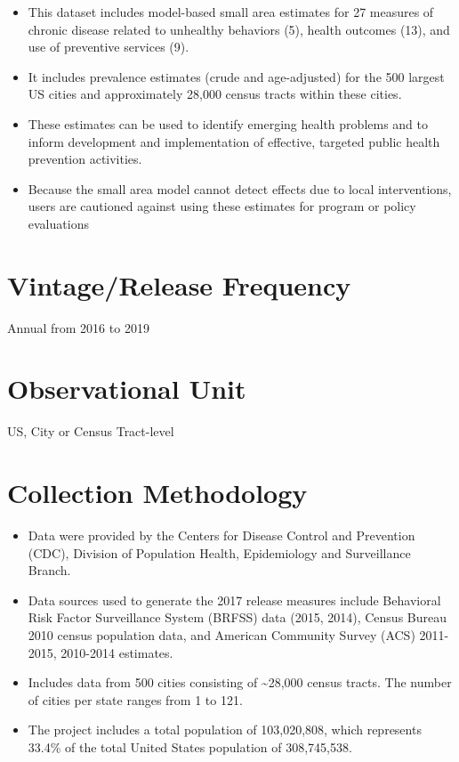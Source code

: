 \documentclass[
]{book}
\providecommand{\tightlist}{%
  \setlength{\itemsep}{0pt}\setlength{\parskip}{0pt}}
\begin{document}
\begin{itemize}
\tightlist
\item
  This dataset includes model-based small area estimates for 27 measures of chronic disease related to unhealthy behaviors (5), health outcomes (13), and use of preventive services (9).
\item
  It includes prevalence estimates (crude and age-adjusted) for the 500 largest US cities and approximately 28,000 census tracts within these cities.
\item
  These estimates can be used to identify emerging health problems and to inform development and implementation of effective, targeted public health prevention activities.
\item
  Because the small area model cannot detect effects due to local interventions, users are cautioned against using these estimates for program or policy evaluations
\end{itemize}

\hypertarget{vintagerelease-frequency-98}{%
\section{Vintage/Release Frequency}\label{vintagerelease-frequency-98}}

Annual from 2016 to 2019

\hypertarget{observational-unit-98}{%
\section{Observational Unit}\label{observational-unit-98}}

US, City or Census Tract-level

\hypertarget{collection-methodology-98}{%
\section{Collection Methodology}\label{collection-methodology-98}}

\begin{itemize}
\tightlist
\item
  Data were provided by the Centers for Disease Control and Prevention (CDC), Division of Population Health, Epidemiology and Surveillance Branch.
\item
  Data sources used to generate the 2017 release measures include Behavioral Risk Factor Surveillance System (BRFSS) data (2015, 2014), Census Bureau 2010 census population data, and American Community Survey (ACS) 2011-2015, 2010-2014 estimates.
\item
  Includes data from 500 cities consisting of \textasciitilde28,000 census tracts. The number of cities per state ranges from 1 to 121.
\item
  The project includes a total population of 103,020,808, which represents 33.4\% of the total United States population of 308,745,538.
\end{itemize}
\end{document}

